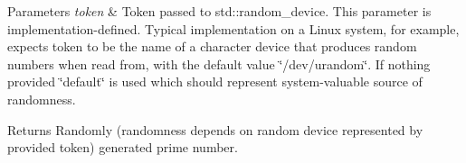 \begin{DoxyParams}{Parameters}
{\em token} & Token passed to {\ttfamily std\-::random\-\_\-device}. This parameter is implementation-\/defined. Typical implementation on a Linux system, for example, expects token to be the name of a character device that produces random numbers when read from, with the default value {\ttfamily \char`\"{}/dev/urandom\char`\"{}}. If nothing provided {\ttfamily \char`\"{}default\char`\"{}} is used which should represent system-\/valuable source of randomness.\\
\hline
\end{DoxyParams}
\begin{DoxyReturn}{Returns}
Randomly (randomness depends on random device represented by provided {\ttfamily token}) generated prime number. 
\end{DoxyReturn}
